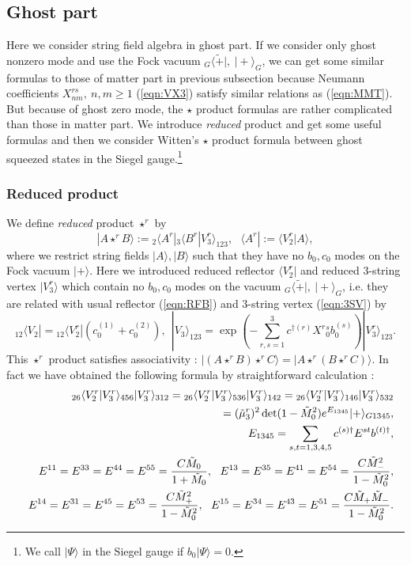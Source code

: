 \documentclass[12pt,a4paper]{article}
\def\M0{{\tilde M}_0}
\def\Mp{{\tilde M}_+}
\def\Mm{{\tilde M}_-}
\def\tm{{\tilde \mu}}
\begin{document}
\subsection{Ghost part}

Here we consider string field algebra in ghost part.
If we consider only ghost nonzero mode and use the Fock vacuum ${}_G\langle{\tilde +}|,\ |+\rangle_G$, we can get some similar formulas to those of matter part in previous subsection because Neumann coefficients $X^{rs}_{nm},\ n,m\geq1$ (\ref{eqn:VX3}) satisfy similar relations as (\ref{eqn:MMT}).  But because of ghost zero mode, the $\star$ product formulas are rather complicated than those in matter part. We introduce  {\it reduced} product and get some useful formulas and then we consider Witten's $\star$ product formula between ghost squeezed states in the Siegel gauge.\footnote{
	We call $|\Psi\rangle$ in the Siegel gauge if $b_0|\Psi\rangle=0$.
}

\subsubsection{Reduced product}

We define {\it reduced} product $\star^r$ by
\begin{equation}
\label{eqn:GSTRR}
|A\star^r B\rangle:= {}_2\langle A^r| {}_3\langle B^r|V^r_3\rangle_{123},\ \ \ \langle A^r|:=\langle V_2^r|A\rangle,
\end{equation}
where we restrict string fields $|A\rangle,|B\rangle$ such that they have no $b_0,c_0$ modes on the Fock vacuum $|+\rangle$.
Here we introduced reduced reflector $\langle V_2^r|$ and reduced 3-string vertex $|V_3^r\rangle$ which contain no $b_0,c_0$ modes on the vacuum ${}_G\langle{\tilde +}|,\ |+\rangle_G$, i.e. they are related with usual reflector (\ref{eqn:RFB}) and 3-string vertex (\ref{eqn:3SV}) by
\begin{equation}
{}_{12}\langle V_2| = {}_{12}\langle V_2^r|(c_0^{(1)}+c_0^{(2)}),\ \ 
|V_3\rangle_{123}=\exp\left(-\sum_{r,s=1}^3c^{\dagger(r)}X^r{}^s_0b^{(s)}_0\right)|V_3^r\rangle_{123}.
\end{equation}
This $\star^r$ product satisfies associativity : $|(A \star^r B)\star^r C\rangle=|A \star^r (B\star^r C)\rangle$. In fact we have obtained the following formula by straightforward calculation :
\begin{eqnarray}
&&{}_{26}\langle V_2^r|V_3^r\rangle_{456}|V_3^r\rangle_{312}= {}_{26}\langle V_2^r|V_3^r\rangle_{536}|V_3^r\rangle_{142}={}_{26}\langle V_2^r|V_3^r\rangle_{146}|V_3^r\rangle_{532}\nonumber \\
&&= (\tm_3^r)^2 \det (1-\M0^2) e^{E_{1345}}|+\rangle_{G1345},\nonumber \\
&&E_{1345}=\sum_{s,t=1,3,4,5}c^{(s)\dagger}E^{st}b^{(t)\dagger},\nonumber \\
&&E^{11}=E^{33}=E^{44}=E^{55}={C\M0 \over1+\M0 },\ \ 
E^{13}=E^{35}=E^{41}=E^{54}={C\Mm^2 \over1-\M0^2 },\nonumber \\
&&E^{14}=E^{31}=E^{45}=E^{53}={C\Mp^2 \over1-\M0^2},\ \ 
E^{15}=E^{34}=E^{43}=E^{51}={C\Mp \Mm \over1-\M0^2}.
\end{eqnarray}
\end{document}
